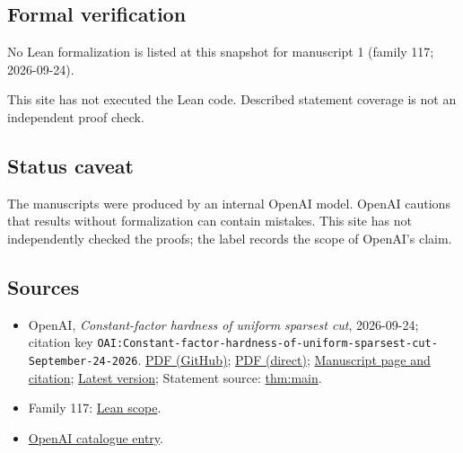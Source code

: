 \documentclass[11pt]{article}
\begin{document}
\subsection{Formal verification}
No Lean formalization is listed at this snapshot for manuscript 1 (family 117; 2026-09-24).

This site has not executed the Lean code. Described statement coverage is not an independent proof check.

\subsection{Status caveat}
The manuscripts were produced by an internal OpenAI model. OpenAI cautions that results without formalization can contain mistakes. This site has not independently checked the proofs; the label records the scope of OpenAI's claim.

\subsection{Sources}
\begin{itemize}
\item OpenAI, \emph{Constant-factor hardness of uniform sparsest cut}, 2026-09-24; citation key \texttt{OAI:Constant-factor-hardness-of-uniform-sparsest-cut-September-24-2026}. \href{https://github.com/openai/math/blob/adc7f1241b42e322a6451854ab7e4b4c146bf78a/preprints/Constant-factor-hardness-of-uniform-sparsest-cut-September-24-2026/Constant-factor-hardness-of-uniform-sparsest-cut-September-24-2026.pdf}{PDF (GitHub)}; \href{https://github.com/openai/math/raw/adc7f1241b42e322a6451854ab7e4b4c146bf78a/preprints/Constant-factor-hardness-of-uniform-sparsest-cut-September-24-2026/Constant-factor-hardness-of-uniform-sparsest-cut-September-24-2026.pdf}{PDF (direct)}; \href{https://github.com/openai/math/blob/adc7f1241b42e322a6451854ab7e4b4c146bf78a/preprints/Constant-factor-hardness-of-uniform-sparsest-cut-September-24-2026/README.md}{Manuscript page and citation}; \href{https://github.com/openai/math/blob/main/preprints/Constant-factor-hardness-of-uniform-sparsest-cut-September-24-2026/Constant-factor-hardness-of-uniform-sparsest-cut-September-24-2026.pdf}{Latest version}; Statement source: \href{https://github.com/openai/math/blob/adc7f1241b42e322a6451854ab7e4b4c146bf78a/preprints/Constant-factor-hardness-of-uniform-sparsest-cut-September-24-2026/build/source/sections/00-introduction.tex\#L16}{thm:main}.
\item Family 117: \href{https://github.com/openai/math/blob/adc7f1241b42e322a6451854ab7e4b4c146bf78a/lean/docs/117.md}{Lean scope}.
\item \href{https://github.com/openai/math/blob/adc7f1241b42e322a6451854ab7e4b4c146bf78a/CONTENTS.md}{OpenAI catalogue entry}.
\end{itemize}
\end{document}
